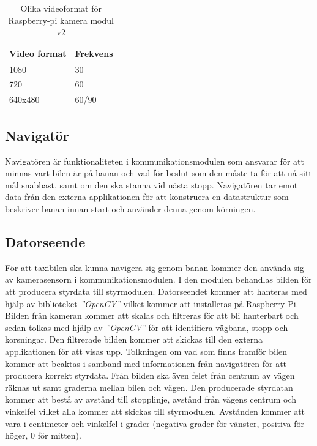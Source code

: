 \documentclass[10pt,oneside,swedish]{lips}
\begin{document}
\begin{table}[htpb]
    \centering
    \caption{Olika videoformat för Raspberry-pi kamera modul v2}
    \label{tab:KameraBild}
    \begin{tabular}{|l|l|}
    \hline
      {\bfseries Video format } & 
      {\bfseries Frekvens}  \\
      \hline
      1080 & 30 \\
      \hline
      720 & 60 \\
      \hline
      640x480 & 60/90 \\
      \hline
    \end{tabular}
\end{table}

\subsection{Navigatör}
Navigatören är funktionaliteten i kommunikationsmodulen som ansvarar för att minnas vart bilen är på banan och vad för beslut som den måste ta för att nå sitt mål snabbast, samt om den ska stanna vid nästa stopp. Navigatören tar emot data från den externa applikationen för att konstruera en datastruktur som beskriver banan innan start och använder denna genom körningen.

\subsection{Datorseende}
För att taxibilen ska kunna navigera sig genom banan kommer den använda sig av kamerasensorn i kommunikationsmodulen. I den modulen behandlas bilden för att producera styrdata till styrmodulen. Datorseendet kommer att hanteras med hjälp av biblioteket \emph{''OpenCV''} vilket kommer att installeras på Raspberry-Pi. 
Bilden från kameran kommer att skalas och filtreras för att bli hanterbart och sedan tolkas med hjälp av \emph{''OpenCV''} för att identifiera vägbana, stopp och korsningar. Den filtrerade bilden  kommer att skickas till den externa applikationen för att visas upp. 
Tolkningen om vad som finns framför bilen kommer att beaktas i samband med informationen från navigatören för att producera korrekt styrdata. Från bilden ska även felet från centrum av vägen räknas ut samt graderna mellan bilen och vägen. 
Den producerade styrdatan kommer att bestå av avstånd till stopplinje, avstånd från vägens centrum och vinkelfel vilket alla kommer att skickas till styrmodulen. Avstånden kommer att vara i centimeter och vinkelfel i grader (negativa grader för vänster, positiva för höger, 0 för mitten).
\end{document}
